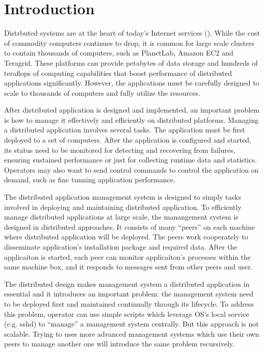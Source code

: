 \section{Introduction}


Distrbuted systems are at the heart of today's Internet
services (). While the cost of commodity
computers continues to drop, it is common for large scale
clusters to contain thousands of computers, such as
PlanetLab, Amazon EC2 and Teragrid. These platforms can
provide petabytes of data storage and hundreds of teraflops
of computing capabilities that boost performance of
distributed applications significantly. However, the
applications must be carefully designed to scale to
thousands of computers and fully utilize the resources.

After distributed application is designed and implemented,
an important problem is how to manage it effectively and
efficiently on distributed platforms. Managing a distributed
application involves several tasks. The application must be
first deployed to a set of computers. After the application
is configured and started, its status need to be monitored
for detecting and recovering from failures, ensuring
sustained performance or just for collecting runtime data
and statistics. Operators may also want to send control
commands to control the application on demand, such as fine
tunning application performance.

The distributed application management system is designed to
simply tasks involved in deploying and maintaining
distributed application. To efficiently manage distributed
applications at large scale, the manangement system is
designed in distributed approaches. It consists of many
``peers''  on each
machine where distributed application will be deployed. The
peers work cooperately to disseminate application's
installation package and required data. After the
applicaiton is started, each peer can monitor applicaiton's
processes within the same machine box, and it responds to
messages sent from other peers and user.

The distributed design makes management system a distributed
application in essential and it introduces an important
problem: the management system need to be deployed first and
maintained continually through its lifecycle. To address
this problem, operator can use simple scripts which leverage
OS's local service (e.g. sshd) to ``manage'' a management
system centrally. But this approach is not scalable. Trying
to uses more advanced management systems which use their own
peers to manage another one will introduce the same problem
recursively.  

